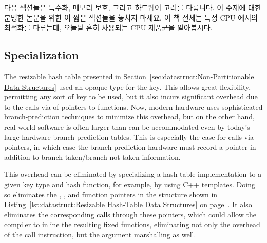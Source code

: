다음 섹션들은 특수화, 메모리 보호, 그리고 하드웨어 고려를 다룹니다.
이 주제에 대한 분명한 논문을 위한 이 짧은 섹션들을 놓치지 마세요.
이 책 전체는 특정 CPU 에서의 최적화를 다루는데, 오늘날 흔히 사용되는 CPU
제품군을 알아봅시다.

\subsection{Specialization}
\label{sec:datastruct:Specialization}

The resizable hash table presented in
Section~\ref{sec:datastruct:Non-Partitionable Data Structures}
used an opaque type for the key.
This allows great flexibility, permitting any sort of key to be
used, but it also incurs significant overhead due to the calls via
of pointers to functions.
Now, modern hardware uses sophisticated branch-prediction techniques
to minimize this overhead, but on the other hand, real-world software
is often larger than can be accommodated even by today's large
hardware branch-prediction tables.
This is especially the case for calls via pointers, in which case
the branch prediction hardware must record a pointer in addition
to branch-taken/branch-not-taken information.

This overhead can be eliminated by specializing a hash-table implementation
to a given key type and hash function, for example, by using C++ templates.
Doing so eliminates the , , and
 function pointers in the  structure shown in
Listing~\ref{lst:datastruct:Resizable Hash-Table Data Structures} on
page~\pageref{lst:datastruct:Resizable Hash-Table Data Structures}.
It also eliminates the corresponding calls through these pointers,
which could allow the compiler to inline the resulting fixed functions,
eliminating not only the overhead of the call instruction, but the
argument marshalling as well.

